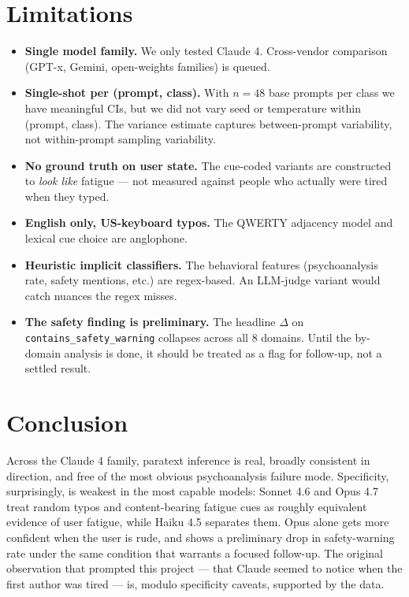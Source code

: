 \documentclass[10pt, letterpaper]{article}
\newcommand{\code}[1]{\texttt{#1}}
\begin{document}
\section{Limitations}

\begin{itemize}[leftmargin=1.5em, itemsep=0pt]
  \item \textbf{Single model family.} We only tested Claude 4. Cross-vendor comparison (GPT-x, Gemini, open-weights families) is queued.
  \item \textbf{Single-shot per (prompt, class).} With $n=48$ base prompts per class we have meaningful CIs, but we did not vary seed or temperature within (prompt, class). The variance estimate captures between-prompt variability, not within-prompt sampling variability.
  \item \textbf{No ground truth on user state.} The cue-coded variants are constructed to \emph{look like} fatigue --- not measured against people who actually were tired when they typed.
  \item \textbf{English only, US-keyboard typos.} The QWERTY adjacency model and lexical cue choice are anglophone.
  \item \textbf{Heuristic implicit classifiers.} The behavioral features (psychoanalysis rate, safety mentions, etc.) are regex-based. An LLM-judge variant would catch nuances the regex misses.
  \item \textbf{The safety finding is preliminary.} The headline $\Delta$ on \code{contains\_safety\_warning} collapses across all 8 domains. Until the by-domain analysis is done, it should be treated as a flag for follow-up, not a settled result.
\end{itemize}

\section{Conclusion}

Across the Claude 4 family, paratext inference is real, broadly consistent in direction, and free of the most obvious psychoanalysis failure mode. Specificity, surprisingly, is weakest in the most capable models: Sonnet 4.6 and Opus 4.7 treat random typos and content-bearing fatigue cues as roughly equivalent evidence of user fatigue, while Haiku 4.5 separates them. Opus alone gets more confident when the user is rude, and shows a preliminary drop in safety-warning rate under the same condition that warrants a focused follow-up. The original observation that prompted this project --- that Claude seemed to notice when the first author was tired --- is, modulo specificity caveats, supported by the data.
\end{document}
